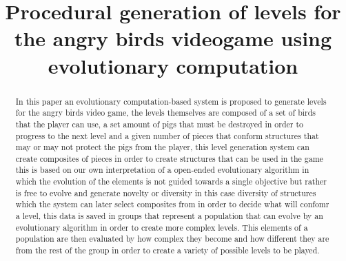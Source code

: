 \documentclass[conference]{IEEEtran}
\begin{document}
\title{Procedural generation of levels for the angry birds videogame using
evolutionary computation\\
}

\author{
\and
{} 
\and
{} }

\maketitle

\begin{abstract}
In this paper an evolutionary computation-based system is proposed to generate 
levels for the angry birds video game, the levels themselves are composed of a 
set of birds that the player can use, a set amount of pigs that must be destroyed 
in order to progress to the next level and a given number of pieces that conform 
structures that may or may not protect the pigs from the player, this level 
generation system can create composites of pieces in order to create structures 
that can be used in the game this is based on our own interpretation of a open-ended 
evolutionary algorithm in which the evolution of the elements is not guided towards 
a single objective but rather is free to evolve and generate novelty or diversity 
in this case diversity of structures which the system can later select composites 
from in order to decide what will confomr a level, this data is saved in groups that represent a population 
that can evolve by an evolutionary algorithm in order to create more complex levels.
 This elements of a population are then evaluated by how complex they become and how 
 different they are from the rest of the group in order to create a variety of possible 
 levels to be played. 

\end{abstract}
\end{document}
